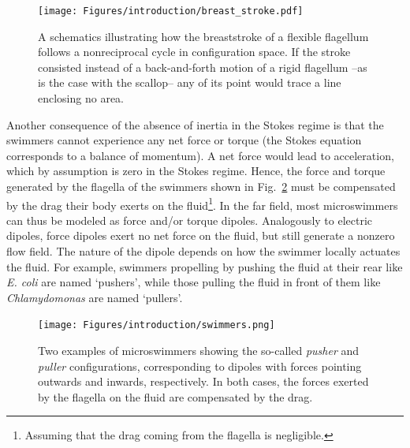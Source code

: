 \begin{figure}[!htb]
    \centering
    \texttt{[image: Figures/introduction/breast\_stroke.pdf]}
    \caption{
        A schematics illustrating how the breaststroke of a flexible flagellum follows a nonreciprocal cycle in configuration space.
        If the stroke consisted instead of a back-and-forth motion of a rigid flagellum --as is the case with the scallop-- any of its point would trace a line enclosing no area.
    }
    \label{fig: breast stroke}
\end{figure}


Another consequence of the absence of inertia in the Stokes regime is that the swimmers cannot experience any net force or torque (the Stokes equation corresponds to a balance of momentum).
A net force would lead to acceleration, which by assumption is zero in the Stokes regime.
Hence, the force and torque generated by the flagella of the swimmers shown in Fig.~\ref{fig: swimmers} must be compensated by the drag their body exerts on the fluid\footnote{Assuming that the drag coming from the flagella is negligible.}. 
In the far field, most microswimmers can thus be modeled as force and/or torque dipoles.
Analogously to electric dipoles, force dipoles exert no net force on the fluid, but still generate a nonzero flow field.
The nature of the dipole 
depends on how the swimmer locally actuates the fluid.
For example, swimmers propelling by pushing the fluid at their rear like \textit{E. coli} are named `pushers', while those pulling the fluid in front of them like \textit{Chlamydomonas} are named `pullers'. 

\begin{figure}[!htb]
    \centering
    \texttt{[image: Figures/introduction/swimmers.png]}
    \caption{Two examples of microswimmers showing the so-called \textit{pusher} and \textit{puller} configurations,
    corresponding to dipoles with forces pointing outwards and inwards, respectively.
    In both cases, the forces exerted by the flagella on the fluid are compensated by the drag. 
    }
    \label{fig: swimmers}
\end{figure}

